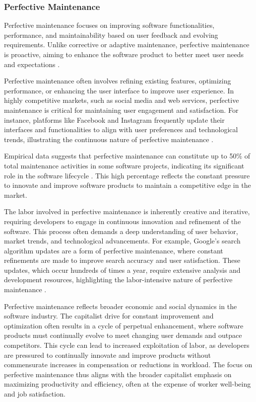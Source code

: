 \begin{refsection}
\subsubsection{Perfective Maintenance}

Perfective maintenance focuses on improving software functionalities, performance, and maintainability based on user feedback and evolving requirements. Unlike corrective or adaptive maintenance, perfective maintenance is proactive, aiming to enhance the software product to better meet user needs and expectations \cite[pp.~120-122]{fowler1999refactoring}.

Perfective maintenance often involves refining existing features, optimizing performance, or enhancing the user interface to improve user experience. In highly competitive markets, such as social media and web services, perfective maintenance is critical for maintaining user engagement and satisfaction. For instance, platforms like Facebook and Instagram frequently update their interfaces and functionalities to align with user preferences and technological trends, illustrating the continuous nature of perfective maintenance \cite[pp.~142-144]{brooks1995mythical}.

Empirical data suggests that perfective maintenance can constitute up to 50\% of total maintenance activities in some software projects, indicating its significant role in the software lifecycle \cite[pp.~223-225]{pigoski2008practical}. This high percentage reflects the constant pressure to innovate and improve software products to maintain a competitive edge in the market.

The labor involved in perfective maintenance is inherently creative and iterative, requiring developers to engage in continuous innovation and refinement of the software. This process often demands a deep understanding of user behavior, market trends, and technological advancements. For example, Google's search algorithm updates are a form of perfective maintenance, where constant refinements are made to improve search accuracy and user satisfaction. These updates, which occur hundreds of times a year, require extensive analysis and development resources, highlighting the labor-intensive nature of perfective maintenance \cite[pp.~221-223]{pressman2019software}.

Perfective maintenance reflects broader economic and social dynamics in the software industry. The capitalist drive for constant improvement and optimization often results in a cycle of perpetual enhancement, where software products must continually evolve to meet changing user demands and outpace competitors. This cycle can lead to increased exploitation of labor, as developers are pressured to continually innovate and improve products without commensurate increases in compensation or reductions in workload. The focus on perfective maintenance thus aligns with the broader capitalist emphasis on maximizing productivity and efficiency, often at the expense of worker well-being and job satisfaction.


\end{refsection}

